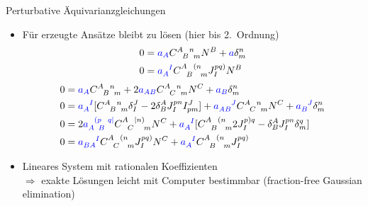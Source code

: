 \documentclass{beamer}
\newcommand{\gmc}[4]{\ensuremath{C^{#1\hphantom{#2}#3}_{\hphantom{#1}{#2}\hphantom{#3}#4}}}
\begin{document}
    \begin{frame}{Perturbative Äquivarianzgleichungen}
        \begin{itemize}
            \item Für erzeugte Ansätze bleibt zu lösen (hier bis 2.\ Ordnung)
            \begin{align*}
                0 &{} = {\color{blue}a_A} \gmc{A}{B}{n}{m} N^B + {\color{blue}a} \delta^n_m \\
                0 &{} = {\color{blue}a_A^{\hphantom AI}}\gmc{A}{B}{(n}{m} J^{pq)}_I N^B
            \end{align*}
            \begin{align*}
                0 &{} = {\color{blue}a_A} \gmc{A}{B}{n}{m} + 2 {\color{blue}a_{AB}} \gmc{A}{C}{n}{m} N^C + {\color{blue}a_B} \delta^n_m \\
                0 &{} = {\color{blue}a_A^{\hphantom AI}}\lbrack \gmc{A}{B}{n}{m} \delta^J_I - 2\delta^A_B J^{pn}_I I^J_{pm}\rbrack + {\color{blue}a_{AB}^{\hphantom{AB}J}}\gmc{A}{C}{n}{m} N^C + {\color{blue}a_B^{\hphantom BJ}} \delta^n_m \\
                0 &{} = 2{\color{blue}a_{A \hphantom pB}^{\hphantom A(p\hphantom Bq\mid}} \gmc{A}{C}{\mid n)}{m} N^C + {\color{blue}a_A^{\hphantom AI}}\lbrack \gmc{A}{B}{(n}{m} 2J^{p)q}_I - \delta^A_B J^{pn}_I \delta^q_m\rbrack \\
                0 &{} = {\color{blue}a_{BA}^{\hphantom{BA}I}} \gmc{A}{C}{(n}{m} J^{pq)}_I N^C + {\color{blue}a_A^{\hphantom AI}}\gmc{A}{B}{(n}{m} J^{pq)}_I
            \end{align*}
            \item Lineares System mit rationalen Koeffizienten \\
            $\Rightarrow$ exakte Lösungen leicht mit Computer bestimmbar (fraction-free Gaussian elimination)
        \end{itemize}
    \end{frame}
\end{document}

